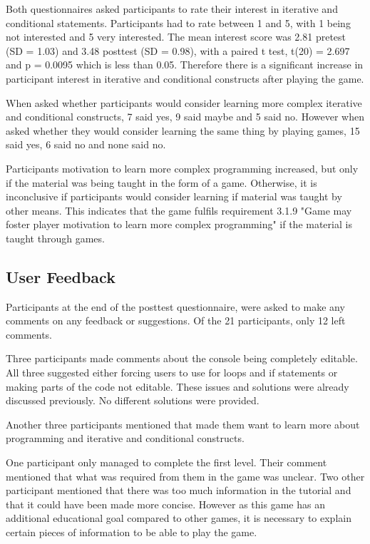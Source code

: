 \documentclass[a4paper,11.5pt]{report}
\numberwithin{figure}{section}
\numberwithin{table}{section}
\numberwithin{equation}{section}
\numberwithin{equation}{section}
\begin{document}
Both questionnaires asked participants to rate their interest in iterative and conditional statements. Participants had to rate between 1 and 5, with 1 being not interested and 5 very interested. The mean interest score was 2.81 pretest (SD = 1.03) and 3.48 posttest (SD = 0.98), with a paired t test, t(20) = 2.697 and p = 0.0095 which is less than 0.05. Therefore there is a significant increase in participant interest in iterative and conditional constructs after playing the game. 

When asked whether participants would consider learning more complex iterative and conditional constructs, 7 said yes, 9 said maybe and 5 said no. However when asked whether they would consider learning the same thing by playing games, 15 said yes, 6 said no and none said no. 

Participants motivation to learn more complex programming increased, but only if the material was being taught in the form of a game. Otherwise, it is inconclusive if participants would consider learning if material was taught by other means. This indicates that the game fulfils requirement 3.1.9 "Game may foster player motivation to learn more complex programming" if the material is taught through games. 





\subsection{User Feedback}


Participants at the end of the posttest questionnaire, were asked to make any comments on any feedback or suggestions. Of the 21 participants, only 12 left comments. 

Three participants made comments about the console being completely editable. All three suggested either forcing users to use for loops and if statements or making parts of the code not editable. These issues and solutions were already discussed previously. No different solutions were provided. 

Another three participants mentioned that made them want to learn more about programming and iterative and conditional constructs. 

One participant only managed to complete the first level. Their comment mentioned that what was required from them in the game was unclear. Two other participant mentioned that there was too much information in the tutorial and that it could have been made more concise. However as this game has an additional educational goal compared to other games, it is necessary to explain certain pieces of information to be able to play the game.
\end{document}
